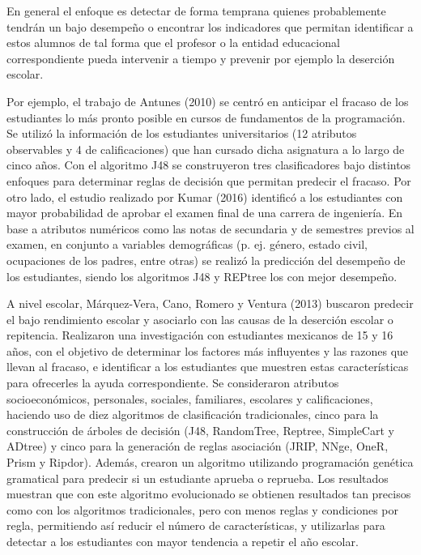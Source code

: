 En general el enfoque es detectar de forma temprana quienes probablemente tendrán un bajo desempeño o encontrar los indicadores que permitan identificar a estos alumnos de tal forma que el profesor o la entidad educacional correspondiente pueda intervenir a tiempo y prevenir por ejemplo la deserción escolar.  

Por ejemplo, el trabajo de Antunes (2010) se centró en anticipar el fracaso de los estudiantes lo más pronto posible en cursos de fundamentos de la programación. Se utilizó la información de los estudiantes universitarios (12 atributos observables y 4 de calificaciones) que han cursado dicha asignatura a lo largo de cinco años. Con el algoritmo J48 se construyeron tres clasificadores bajo distintos enfoques para determinar reglas de decisión que permitan predecir el fracaso. Por  otro lado, el estudio realizado por Kumar (2016) identificó a los estudiantes con mayor probabilidad de aprobar el examen final de una carrera de ingeniería. En base a atributos numéricos como las notas de secundaria y de semestres previos al examen, en conjunto a variables demográficas (p. ej. género, estado civil, ocupaciones de los padres, entre otras) se realizó la predicción del desempeño de los estudiantes, siendo los algoritmos J48 y REPtree los con mejor desempeño.

A nivel escolar, Márquez-Vera, Cano, Romero y Ventura (2013) buscaron predecir el bajo rendimiento escolar y asociarlo con las causas de la deserción escolar o repitencia. Realizaron una investigación con estudiantes mexicanos de 15 y 16 años, con el objetivo de determinar los factores más influyentes y las razones que llevan al fracaso, e identificar a los estudiantes que muestren estas características para ofrecerles la ayuda correspondiente. Se consideraron atributos socioeconómicos, personales, sociales, familiares, escolares y calificaciones, haciendo uso de diez algoritmos de clasificación tradicionales, cinco para la construcción de árboles de decisión (J48, RandomTree, Reptree, SimpleCart y ADtree) y cinco para la generación de reglas asociación (JRIP, NNge, OneR, Prism y Ripdor). Además, crearon un algoritmo utilizando programación genética gramatical para predecir si un estudiante aprueba o reprueba. Los resultados muestran que con este algoritmo evolucionado se obtienen resultados tan precisos como con los algoritmos tradicionales, pero con menos reglas y condiciones por regla, permitiendo así reducir el número de características, y utilizarlas para detectar a los estudiantes con mayor tendencia a repetir el año escolar.  

